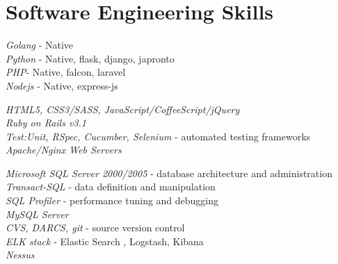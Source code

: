 \documentclass[10pt]{article} %
\begin{document}



\newpage

\section{Software Engineering Skills}

{
    \textit{Golang} - Native\\
    \textit{Python} - Native, flask, django, japronto\\
    \textit{PHP}- Native, falcon, laravel\\
    \textit{Nodejs} - Native, express-js
}


{
    \textit{HTML5, CSS3/SASS, JavaScript/CoffeeScript/jQuery}\\
    \textit{Ruby on Rails v3.1}\\
    \textit{Test:Unit, RSpec, Cucumber, Selenium} - automated testing frameworks\\
    \textit{Apache/Nginx Web Servers}\\
}


{
    \textit{Microsoft SQL Server 2000/2005} - database architecture and administration\\
    \textit{Transact-SQL} - data definition and manipulation\\
    \textit{SQL Profiler} - performance tuning and debugging\\
    \textit{MySQL Server}\\
    \textit{CVS, DARCS, git} - source version control\\
    \textit{ELK stack} - Elastic Search , Logstash, Kibana\\
    \textit{Nessus} 
}
\end{document}
